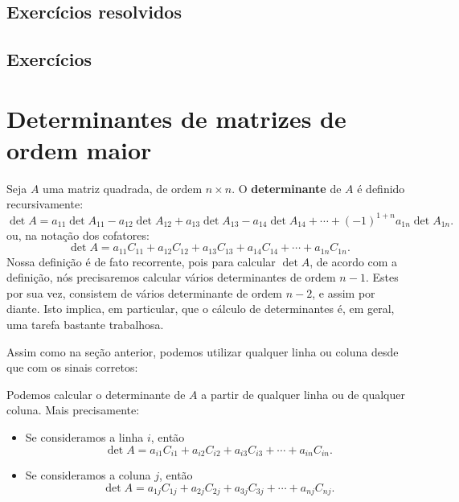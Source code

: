 \subsection*{Exercícios resolvidos}

\construirExeresol

\subsection*{Exercícios}

\construirExer


\section{Determinantes de matrizes de ordem maior}

Seja $A$ uma matriz quadrada, de ordem $n \times n$. O \textbf{determinante} de $A$ é definido recursivamente:
\begin{equation}\label{defdet}
\boxed{\det A = a_{11} \det A_{11} - a_{12} \det A_{12} +  a_{13} \det A_{13} - a_{14} \det A_{14} + \cdots + (-1)^{1+n}  a_{1n} \det A_{1n}.}
\end{equation} ou, na notação dos cofatores:
\begin{equation}
\boxed{\det A = a_{11} C_{11} + a_{12} C_{12} + a_{13} C_{13} + a_{14} C_{14} + \cdots + a_{1n} C_{1n}.}
\end{equation} Nossa definição é de fato recorrente, pois para calcular $\det A$, de acordo com a definição, nós precisaremos calcular vários determinantes de ordem $n-1$. Estes por sua vez, consistem de vários determinante de ordem $n-2$, e assim por diante. Isto implica, em particular, que o cálculo de determinantes é, em geral, uma tarefa bastante trabalhosa.

Assim como na seção anterior, podemos utilizar qualquer linha ou coluna desde que com os sinais corretos:


\begin{teo}
	Podemos calcular o determinante de $A$ a partir de qualquer linha ou de qualquer coluna. Mais precisamente:
	\begin{itemize}
		\item Se consideramos a linha $i$, então
		\begin{equation}
		\det A = a_{i1} C_{i1} + a_{i2} C_{i2} + a_{i3} C_{i3} + \cdots + a_{in} C_{in}.
		\end{equation}
		\item Se consideramos a coluna $j$, então
		\begin{equation}
		\det A = a_{1j} C_{1j} + a_{2j} C_{2j} + a_{3j} C_{3j} + \cdots + a_{nj} C_{nj}.
		\end{equation}
	\end{itemize}
\end{teo}

